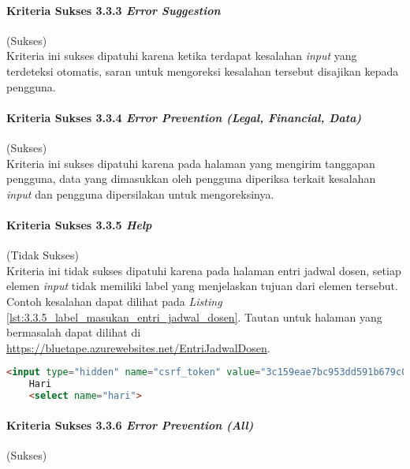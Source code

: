 \paragraph{Kriteria Sukses 3.3.3 \textit{Error Suggestion}}
\label{par:kepatuhan_bluetape_kriteria_sukses_3.3.3}
(Sukses)\\

Kriteria ini sukses dipatuhi karena ketika terdapat kesalahan \textit{input} yang terdeteksi otomatis, saran untuk mengoreksi kesalahan tersebut disajikan kepada pengguna.

\paragraph{Kriteria Sukses 3.3.4 \textit{Error Prevention (Legal, Financial, Data)}}
\label{par:kepatuhan_bluetape_kriteria_sukses_3.3.4}
(Sukses)\\

Kriteria ini sukses dipatuhi karena pada halaman yang mengirim tanggapan pengguna, data yang dimasukkan oleh pengguna diperiksa terkait kesalahan \textit{input} dan pengguna dipersilakan untuk mengoreksinya.

\paragraph{Kriteria Sukses 3.3.5 \textit{Help}}
\label{par:kepatuhan_bluetape_kriteria_sukses_3.3.5}
(Tidak Sukses)\\

Kriteria ini tidak sukses dipatuhi karena pada halaman entri jadwal dosen, setiap elemen \textit{input} tidak memiliki label yang menjelaskan tujuan dari elemen tersebut. Contoh kesalahan dapat dilihat pada \textit{Listing} \ref{lst:3.3.5_label_masukan_entri_jadwal_dosen}. Tautan untuk halaman yang bermasalah dapat dilihat di \url{https://bluetape.azurewebsites.net/EntriJadwalDosen}.

\begin{lstlisting}[frame=single, label={lst:3.3.5_label_masukan_entri_jadwal_dosen}, language=HTML, caption=Pelanggaran Kriteria Sukses 3.3.5 pada Halaman Entri Jadwal Dosen]
    <input type="hidden" name="csrf_token" value="3c159eae7bc953dd591b679c080ed066"/>
    Hari
    <select name="hari">
\end{lstlisting}

\paragraph{Kriteria Sukses 3.3.6 \textit{Error Prevention (All)}}
\label{par:kepatuhan_bluetape_kriteria_sukses_3.3.6}
(Sukses)\\

